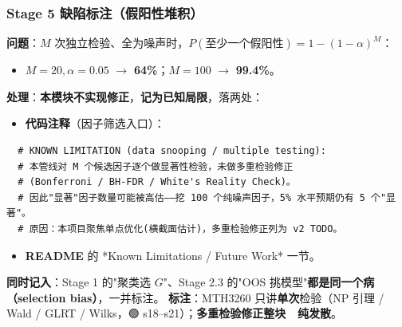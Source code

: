 \documentclass[11pt]{article}
\begin{document}
\subsubsection{\texorpdfstring{Stage 5 \textperiodcentered{} 缺陷标注（假阳性堆积）}{Stage 5 · 缺陷标注（假阳性堆积）}}
\textbf{问题}：$M$ 次独立检验、全为噪声时，$P(\text{至少一个假阳性})=1-(1-\alpha)^M$：
\begin{itemize}
  \item $M=20,\alpha=0.05$ \ensuremath{\rightarrow} \textbf{64\%}；$M=100$ \ensuremath{\rightarrow} \textbf{99.4\%}。
\end{itemize}
\textbf{处理}：\textbf{本模块不实现修正}，\textbf{记为已知局限}，落两处：
\begin{itemize}
  \item \textbf{代码注释}（因子筛选入口）：
\end{itemize}
\begin{verbatim}
  # KNOWN LIMITATION (data snooping / multiple testing):
  # 本管线对 M 个候选因子逐个做显著性检验，未做多重检验修正
  # (Bonferroni / BH-FDR / White's Reality Check)。
  # 因此"显著"因子数量可能被高估——挖 100 个纯噪声因子，5% 水平预期仍有 5 个"显著"。
  # 原因：本项目聚焦单点优化(横截面估计)，多重检验修正列为 v2 TODO。
\end{verbatim}
\begin{itemize}
  \item \textbf{README} 的 *Known Limitations / Future Work* 一节。
\end{itemize}
\textbf{同时记入}：Stage 1 的"聚类选 $G$"、Stage 2.3 的"OOS 挑模型"\textbf{都是同一个病（selection bias）}，一并标注。
\textbf{标注}：MTH3260 只讲\textbf{单次}检验（NP 引理 / Wald / GLRT / Wilks，🟢 s18--s21）；\textbf{多重检验修正整块 🔴 纯发散}。
\end{document}

